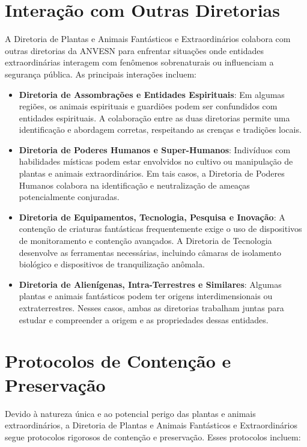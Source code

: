 \section{Interação com Outras Diretorias}

A Diretoria de Plantas e Animais Fantásticos e Extraordinários colabora com outras diretorias da ANVESN para enfrentar situações onde entidades extraordinárias interagem com fenômenos sobrenaturais ou influenciam a segurança pública. As principais interações incluem:

\begin{itemize}
    \item \textbf{Diretoria de Assombrações e Entidades Espirituais}: Em algumas regiões, os animais espirituais e guardiões podem ser confundidos com entidades espirituais. A colaboração entre as duas diretorias permite uma identificação e abordagem corretas, respeitando as crenças e tradições locais.
    \item \textbf{Diretoria de Poderes Humanos e Super-Humanos}: Indivíduos com habilidades místicas podem estar envolvidos no cultivo ou manipulação de plantas e animais extraordinários. Em tais casos, a Diretoria de Poderes Humanos colabora na identificação e neutralização de ameaças potencialmente conjuradas.
    \item \textbf{Diretoria de Equipamentos, Tecnologia, Pesquisa e Inovação}: A contenção de criaturas fantásticas frequentemente exige o uso de dispositivos de monitoramento e contenção avançados. A Diretoria de Tecnologia desenvolve as ferramentas necessárias, incluindo câmaras de isolamento biológico e dispositivos de tranquilização anômala.
    \item \textbf{Diretoria de Alienígenas, Intra-Terrestres e Similares}: Algumas plantas e animais fantásticos podem ter origens interdimensionais ou extraterrestres. Nesses casos, ambas as diretorias trabalham juntas para estudar e compreender a origem e as propriedades dessas entidades.
\end{itemize}

\section{Protocolos de Contenção e Preservação}
Devido à natureza única e ao potencial perigo das plantas e animais extraordinários, a Diretoria de Plantas e Animais Fantásticos e Extraordinários segue protocolos rigorosos de contenção e preservação. Esses protocolos incluem:

